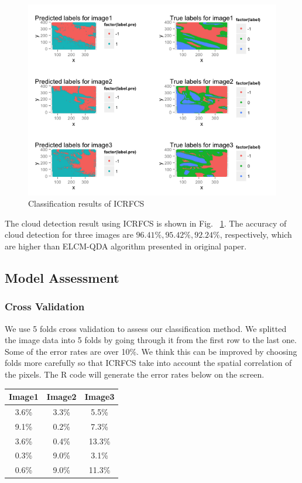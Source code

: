 \documentclass[english]{article}\usepackage{graphicx, color}
\numberwithin{equation}{section}
\numberwithin{figure}{section}
\begin{document}
\begin{figure}[!h]
  \begin{center}
    \includegraphics[width=\columnwidth]{../figures/CRF.png}
  \end{center}
  \caption{Classification results of ICRFCS}
  \label{fig:ICRFCS}
\end{figure}

The cloud detection result using ICRFCS is shown in Fig. ~\ref{fig:ICRFCS}. The 
accuracy of cloud detection for three images are $96.41\%, 95.42\%, 92.24\%$, 
respectively, which are higher than ELCM-QDA algorithm presented in original 
paper.

\subsection{Model Assessment}
\subsubsection{Cross Validation}
We use 5 folds cross validation to assess our classification method. We splitted the image data into 5 folds by going through it from the first row to the last one. Some of the error rates are over 10\%. We think this can be improved by choosing folds more carefully so that ICRFCS take into account the spatial correlation of the pixels. The R code will generate the error rates below on the screen.

\begin{center}
 \begin{tabular}{||c c c||} 
 \hline
 Image1 & Image2 & Image3 \\ [0.5ex] 
 \hline\hline
 3.6\% & 3.3\% & 5.5\% \\ 
 \hline
 9.1\% & 0.2\% & 7.3\% \\
 \hline
 3.6\% & 0.4\% & 13.3\% \\
 \hline
 0.3\% & 9.0\% & 3.1\% \\
 \hline
 0.6\% & 9.0\% & 11.3\% \\ [1ex] 
 \hline
\end{tabular}
\end{center}
\end{document}
